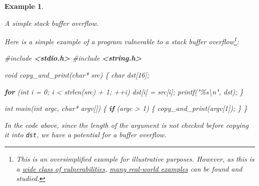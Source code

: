 \documentclass[
  a4paper,
]{report}
\newtheorem{example}{Example}
\newenvironment{Shaded}{}{}
\newcommand{\ControlFlowTok}[1]{\textcolor[rgb]{0.00,0.44,0.13}{\textbf{#1}}}
\newcommand{\DataTypeTok}[1]{\textcolor[rgb]{0.56,0.13,0.00}{#1}}
\newcommand{\DecValTok}[1]{\textcolor[rgb]{0.25,0.63,0.44}{#1}}
\newcommand{\ImportTok}[1]{\textcolor[rgb]{0.00,0.50,0.00}{\textbf{#1}}}
\newcommand{\NormalTok}[1]{#1}
\newcommand{\OperatorTok}[1]{\textcolor[rgb]{0.40,0.40,0.40}{#1}}
\newcommand{\PreprocessorTok}[1]{\textcolor[rgb]{0.74,0.48,0.00}{#1}}
\newcommand{\SpecialCharTok}[1]{\textcolor[rgb]{0.25,0.44,0.63}{#1}}
\newcommand{\StringTok}[1]{\textcolor[rgb]{0.25,0.44,0.63}{#1}}
\begin{document}
\label{ex:stack-buffer-overflow}
\begin{example}

\label{ex:stack-buffer-overflow}

\textup{A simple stack buffer overflow.}

Here is a simple example of a program vulnerable to a stack buffer
overflow\footnote{This is an oversimplified example for illustrative
  purposes. However, as this is a
  \href{https://cwe.mitre.org/data/definitions/121.html}{wide class of
  vulnerabilities},
  \href{https://www.cvedetails.com/vulnerability-list/cweid-121/vulnerabilities.html}{many
  real-world examples} can be found and studied.}:

\begin{Shaded}
\begin{Highlighting}[]
\PreprocessorTok{\#include }\ImportTok{\textless{}stdio.h\textgreater{}}
\PreprocessorTok{\#include }\ImportTok{\textless{}string.h\textgreater{}}

\DataTypeTok{void}\NormalTok{ copy\_and\_print}\OperatorTok{(}\DataTypeTok{char}\OperatorTok{*}\NormalTok{ src}\OperatorTok{)} \OperatorTok{\{}
  \DataTypeTok{char}\NormalTok{ dst}\OperatorTok{[}\DecValTok{16}\OperatorTok{];}

  \ControlFlowTok{for} \OperatorTok{(}\DataTypeTok{int}\NormalTok{ i }\OperatorTok{=} \DecValTok{0}\OperatorTok{;}\NormalTok{ i }\OperatorTok{\textless{}}\NormalTok{ strlen}\OperatorTok{(}\NormalTok{src}\OperatorTok{)} \OperatorTok{+} \DecValTok{1}\OperatorTok{;} \OperatorTok{++}\NormalTok{i}\OperatorTok{)}
\NormalTok{    dst}\OperatorTok{[}\NormalTok{i}\OperatorTok{]} \OperatorTok{=}\NormalTok{ src}\OperatorTok{[}\NormalTok{i}\OperatorTok{];}
\NormalTok{  printf}\OperatorTok{(}\StringTok{"}\SpecialCharTok{\%s\textbackslash{}n}\StringTok{"}\OperatorTok{,}\NormalTok{ dst}\OperatorTok{);}
\OperatorTok{\}}

\DataTypeTok{int}\NormalTok{ main}\OperatorTok{(}\DataTypeTok{int}\NormalTok{ argc}\OperatorTok{,} \DataTypeTok{char}\OperatorTok{*}\NormalTok{ argv}\OperatorTok{[])} \OperatorTok{\{}
  \ControlFlowTok{if} \OperatorTok{(}\NormalTok{argc }\OperatorTok{\textgreater{}} \DecValTok{1}\OperatorTok{)} \OperatorTok{\{}
\NormalTok{    copy\_and\_print}\OperatorTok{(}\NormalTok{argv}\OperatorTok{[}\DecValTok{1}\OperatorTok{]);}
  \OperatorTok{\}}
\OperatorTok{\}}
\end{Highlighting}
\end{Shaded}

In the code above, since the length of the argument is not checked
before copying it into \texttt{dst}, we have a potential for a buffer
overflow.


\end{example}
\end{document}
